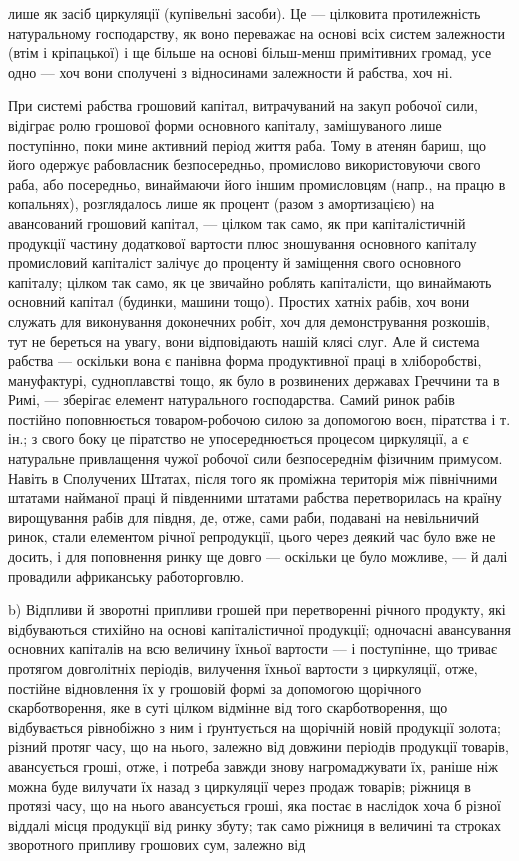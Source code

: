 \parcont{}  %
лише як засіб циркуляції (купівельні засоби). Це — цілковита протилежність
натуральному господарству, як воно переважає на основі всіх систем
залежности (втім і кріпацької) і ще більше на основі більш-менш примітивних
громад, усе одно — хоч вони сполучені з відносинами залежности
й рабства, хоч ні.

При системі рабства грошовий капітал, витрачуваний на закуп робочої
сили, відіграє ролю грошової форми основного капіталу, замішуваного
лише поступінно, поки мине активний період життя раба. Тому
в атенян бариш, що його одержує рабовласник безпосередньо, промислово
використовуючи свого раба, або посередньо, винаймаючи його іншим
промисловцям (напр., на працю в копальнях), розглядалось лише як
процент (разом з амортизацією) на авансований грошовий капітал, —
цілком так само, як при капіталістичній продукції частину додаткової
вартости плюс зношування основного капіталу промисловий капіталіст залічує
до проценту й заміщення свого основного капіталу; цілком так само, як
це звичайно роблять капіталісти, що винаймають основний капітал (будинки,
машини тощо). Простих хатніх рабів, хоч вони служать для виконування
доконечних робіт, хоч для демонстрування розкошів, тут не береться на
увагу, вони відповідають нашій клясі слуг. Але й система рабства —
оскільки вона є панівна форма продуктивної праці в хліборобстві, мануфактурі,
судноплавстві тощо, як було в розвинених державах Греччини та
в Римі, — зберігає елемент натурального господарства. Самий ринок
рабів постійно поповнюється товаром-робочою силою за допомогою воєн,
піратства і т. ін.; з свого боку це піратство не упосереднюється процесом
циркуляції, а є натуральне привлащення чужої робочої сили
безпосереднім фізичним примусом. Навіть в Сполучених Штатах, після
того як проміжна територія між північними штатами найманої праці й
південними штатами рабства перетворилась на країну вирощування рабів
для півдня, де, отже, сами раби, подавані на невільничий ринок, стали
елементом річної репродукції, цього через деякий час було вже не досить,
і для поповнення ринку ще довго — оскільки це було можливе, — й
далі провадили африканську работорговлю.

b) Відпливи й зворотні припливи грошей при перетворенні річного
продукту, які відбуваються стихійно на основі капіталістичної продукції;
одночасні авансування основних капіталів на всю величину їхньої вартости
— і поступінне, що триває протягом довголітніх періодів, вилучення
їхньої вартости з циркуляції, отже, постійне відновлення їх у грошовій
формі за допомогою щорічного скарботворення, яке в суті цілком
відмінне від того скарботворення, що відбувається рівнобіжно з ним і
ґрунтується на щорічній новій продукції золота; різний протяг часу, що
на нього, залежно від довжини періодів продукції товарів, авансується
гроші, отже, і потреба завжди знову нагромаджувати їх, раніше ніж
можна буде вилучати їх назад з циркуляції через продаж товарів; ріжниця
в протязі часу, що на нього авансується гроші, яка постає в наслідок
хоча б різної віддалі місця продукції від ринку збуту; так само ріжниця
в величині та строках зворотного припливу грошових сум, залежно від
\parbreak{}  %
